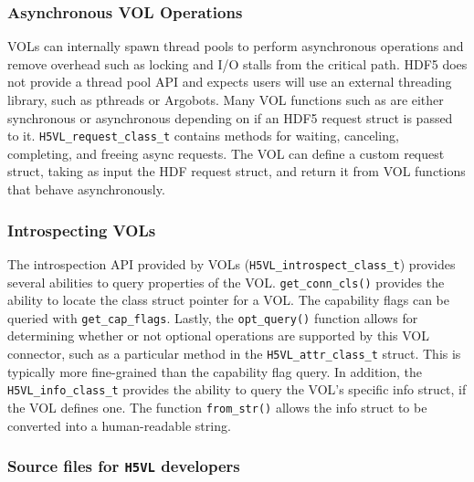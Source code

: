 \subsubsection{Asynchronous VOL Operations}

VOLs can internally spawn thread pools to perform asynchronous operations and remove overhead such as locking and I/O stalls from the critical path. HDF5 does not provide a thread pool API and expects users will use an external threading library, such as pthreads or Argobots. Many VOL functions such as  are either synchronous or asynchronous depending on if an HDF5 request struct is passed to it. \texttt{H5VL\_request\_class\_t} contains methods for waiting, canceling, completing, and freeing async requests. The VOL can define a custom request struct, taking as input the HDF request struct, and return it from VOL functions that behave asynchronously.

\subsubsection{Introspecting VOLs}

The introspection API provided by VOLs (\texttt{H5VL\_introspect\_class\_t}) provides several abilities to query properties of the VOL. \texttt{get\_conn\_cls()} provides the ability to locate the class struct pointer for a VOL. The capability flags can be queried with \texttt{get\_cap\_flags}. Lastly, the \texttt{opt\_query()} function allows for determining whether or not optional operations are supported by this VOL connector, such as a particular method in the \texttt{H5VL\_attr\_class\_t} struct. This is typically more fine-grained than the capability flag query. In addition, the \texttt{H5VL\_info\_class\_t} provides the ability to query the VOL's specific info struct, if the VOL defines one. The function \texttt{from\_str()} allows the info struct to be converted into a human-readable string.

\subsubsection{Source files for \texttt{H5VL} developers}

